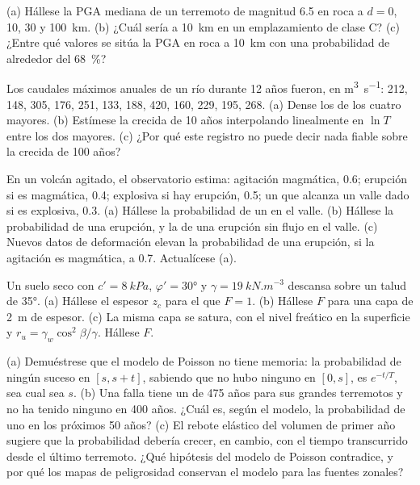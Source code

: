 \begin{exercise}[$\star\star$]\label{exo:b2:geological-hazards:6}
(a) Hállese la PGA mediana de un terremoto de magnitud 6.5 en roca a $d = 0$, 10, 30 y
\qty{100}{km}. (b) ¿Cuál sería a \qty{10}{km} en un emplazamiento de clase C? (c) ¿Entre qué valores
se sitúa la PGA en roca a \qty{10}{km} con una probabilidad de alrededor del \qty{68}{\percent}?
\end{exercise}

\begin{exercise}[$\star\star$]\label{exo:b2:geological-hazards:7}
Los caudales máximos anuales de un río durante 12 años fueron, en \unit{m^3.s^{-1}}: 212, 148, 305, 176, 251, 133, 188,
420, 160, 229, 195, 268. (a) Dense los  de los cuatro mayores. (b) Estímese la crecida de 10
años interpolando linealmente en $\ln T$ entre los dos mayores. (c) ¿Por qué este registro no puede decir
nada fiable sobre la crecida de 100 años?
\end{exercise}

\begin{exercise}[$\star\star$]\label{exo:b2:geological-hazards:8}
En un volcán agitado, el observatorio estima: agitación magmática, 0.6; erupción si es magmática, 0.4;
explosiva si hay erupción, 0.5; un  que alcanza un valle dado si es explosiva, 0.3. (a) Hállese
la probabilidad de un  en el valle. (b) Hállese la probabilidad de una erupción, y
la de una erupción sin flujo en el valle. (c) Nuevos datos de deformación elevan la probabilidad de una
erupción, si la agitación es magmática, a 0.7. Actualícese (a).
\end{exercise}

\begin{exercise}[$\star\star$]\label{exo:b2:geological-hazards:9}
Un suelo seco con $c' = \qty{8}{kPa}$, $\varphi' = \ang{30}$ y $\gamma = \qty{19}{kN.m^{-3}}$ descansa sobre
un talud de \ang{35}. (a) Hállese el espesor $z_c$ para el que $F = 1$. (b) Hállese $F$ para una capa de
\qty{2}{m} de espesor. (c) La misma capa se satura, con el nivel freático en la superficie y
$r_u = \gamma_w\cos^2\beta/\gamma$. Hállese $F$.
\end{exercise}

\begin{exercise}[$\star\star\star$]\label{exo:b2:geological-hazards:10}
(a) Demuéstrese que el modelo de Poisson no tiene memoria: la probabilidad de ningún suceso en $[s, s + t]$, sabiendo que
no hubo ninguno en $[0, s]$, es $e^{-t/T}$, sea cual sea $s$. (b) Una falla tiene un  de 475 años para sus
grandes terremotos y no ha tenido ninguno en 400 años. ¿Cuál es, según el modelo, la probabilidad de uno
en los próximos 50 años? (c) El rebote elástico del volumen de primer año sugiere que la probabilidad
debería crecer, en cambio, con el tiempo transcurrido desde el último terremoto. ¿Qué hipótesis del modelo de Poisson
contradice, y por qué los mapas de peligrosidad conservan el modelo para las fuentes zonales?
\end{exercise}

